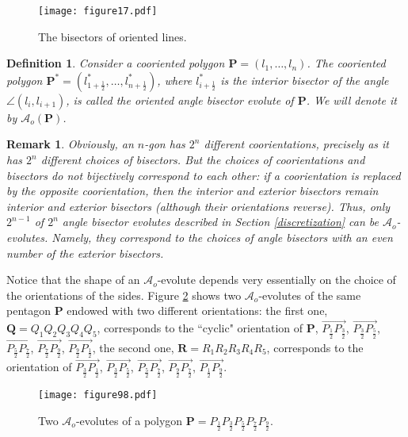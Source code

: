 \documentclass[12pt]{article}
\newtheorem{remark}[lemma]{Remark}
\newtheorem{definition}[lemma]{Definition}
\newcommand{\Aeo}{\mathcal{A}_o}
\renewcommand{\P}{\mathbf{P}}
\begin{document}
\begin{figure}[htbp]
\centering
\texttt{[image: figure17.pdf]}
\caption{The bisectors of oriented lines.}
\label{OrBisector}
\end{figure}

\begin{definition} \label{Aeo}
Consider a cooriented polygon $\P =(l_1, \ldots, l_n)$. The cooriented polygon $\P^*=(l^*_{1+\frac12}, \ldots, l^*_{n+\frac12})$, where $l^\ast_{i+\frac12}$ is the interior bisector of the angle $\angle(l_i,l_{i+1})$, is called the  \emph{oriented angle bisector evolute of $\P$}. We will denote it by $\Aeo(\P)$. 
\end{definition}
\begin{remark}
{\rm 
Obviously, an $n$-gon has $2^n$ different coorientations, precisely as it has $2^n$ different choices of bisectors. But the choices of coorientations and bisectors do not bijectively correspond to each other: if a coorientation is replaced by the opposite coorientation, then the interior and exterior bisectors remain interior and exterior bisectors (although their orientations reverse). Thus, only $2^{n-1}$ of $2^n$ angle bisector evolutes described in Section \ref{discretization} can be $\Aeo$-evolutes. Namely, they correspond to the choices of angle bisectors with an even number of the exterior bisectors.
}
\end{remark}

Notice that the shape of an $\Aeo$-evolute depends very essentially on the choice of the orientations of the sides. Figure \ref{Aeo_vs_Aec} shows two $\Aeo$-evolutes of the same pentagon $\P$ endowed with two different orientations: the first one, $\mathbf Q=Q_1Q_2Q_3Q_4Q_5$, corresponds to the ``cyclic" orientation of $\P$, $\overrightarrow{P_{\frac12}P_{\frac32}}$, $\overrightarrow{P_{\frac32}P_{\frac52}}$, $\overrightarrow{P_{\frac52}P_{\frac72}}$, $\overrightarrow{P_{\frac72}P_{\frac92}}$, $\overrightarrow{P_{\frac92}P_{\frac12}}$, the second one, $\mathbf R=R_1R_2R_3R_4R_5$, corresponds to the orientation of $\overrightarrow{P_{\frac32}P_{\frac12}}$, $\overrightarrow{P_{\frac32}P_{\frac52}}$, $\overrightarrow{P_{\frac52}P_{\frac72}}$, $\overrightarrow{P_{\frac92}P_{\frac72}}$, $\overrightarrow{P_{\frac12}P_{\frac92}}$.

\begin{figure}[htbp]
\centering
\texttt{[image: figure98.pdf]}
\caption{Two $\Aeo$-evolutes of a polygon $\P=P_{\frac12}P_{\frac32}P_{\frac52}P_{\frac72}P_{\frac92}$.}
\label{Aeo_vs_Aec}
\end{figure}
\end{document}
